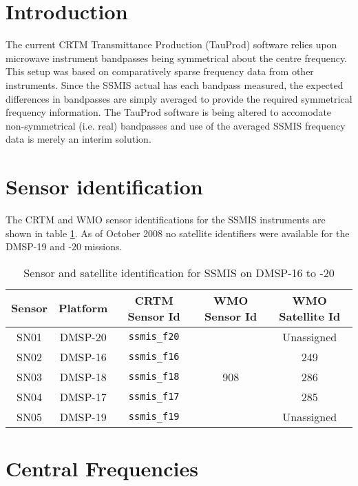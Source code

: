 \section{Introduction}

The current CRTM Transmittance Production (TauProd) software relies upon microwave instrument bandpasses being symmetrical about the centre frequency. This setup was based on comparatively sparse frequency data from other instruments. Since the SSMIS actual has each bandpass measured, the expected differences in bandpasses are simply averaged to provide the required symmetrical frequency information. The TauProd software is being altered to accomodate non-symmetrical (i.e. real) bandpasses and use of the averaged SSMIS frequency data is merely an interim solution.


\section{Sensor identification}
The CRTM and WMO\cite{WMO_Common_Code_Tables} sensor identifications for the SSMIS instruments are shown in table \ref{tab:ssmis_sensor_id}. As of October 2008 no satellite identifiers were available for the DMSP-19 and -20 missions.

\begin{table}[htp]
  \centering
  \begin{tabular}{c c c c c}
    \hline
    \textbf{Sensor} & \textbf{Platform} & \textbf{CRTM Sensor Id} & \textbf{WMO Sensor Id} & \textbf{WMO Satellite Id} \\
    \hline\hline
    SN01 & DMSP-20 & \texttt{ssmis\_f20} &     & Unassigned \\
    SN02 & DMSP-16 & \texttt{ssmis\_f16} &     & 249 \\
    SN03 & DMSP-18 & \texttt{ssmis\_f18} & 908 & 286 \\
    SN04 & DMSP-17 & \texttt{ssmis\_f17} &     & 285 \\
    SN05 & DMSP-19 & \texttt{ssmis\_f19} &     & Unassigned \\
    \hline
  \end{tabular}
  \caption{Sensor and satellite identification for SSMIS on DMSP-16 to -20}
  \label{tab:ssmis_sensor_id}
\end{table}



\section{Central Frequencies}

